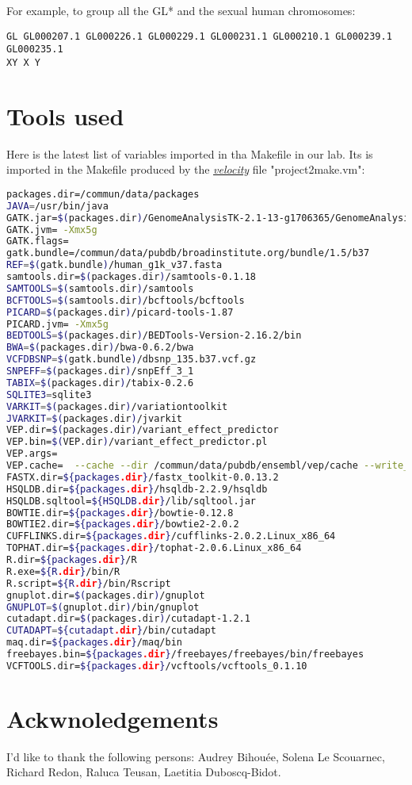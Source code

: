 \documentclass{article}
\newcommand{\velocity}{\href{http://velocity.apache.org/}{\em{velocity}}}
\begin{document}
For example, to group all the GL* and the sexual human chromosomes:
\begin{lstlisting}
GL GL000207.1 GL000226.1 GL000229.1 GL000231.1 GL000210.1 GL000239.1 GL000235.1 
XY X Y
\end{lstlisting} 

\section{Tools used}
Here is the latest list of variables imported in tha Makefile in our lab. Its is imported in the Makefile produced by the \velocity{} file "project2make.vm":
\begin{lstlisting}[language=bash]
packages.dir=/commun/data/packages
JAVA=/usr/bin/java
GATK.jar=$(packages.dir)/GenomeAnalysisTK-2.1-13-g1706365/GenomeAnalysisTK.jar
GATK.jvm= -Xmx5g
GATK.flags=
gatk.bundle=/commun/data/pubdb/broadinstitute.org/bundle/1.5/b37
REF=$(gatk.bundle)/human_g1k_v37.fasta
samtools.dir=$(packages.dir)/samtools-0.1.18
SAMTOOLS=$(samtools.dir)/samtools 
BCFTOOLS=$(samtools.dir)/bcftools/bcftools
PICARD=$(packages.dir)/picard-tools-1.87
PICARD.jvm= -Xmx5g 
BEDTOOLS=$(packages.dir)/BEDTools-Version-2.16.2/bin
BWA=$(packages.dir)/bwa-0.6.2/bwa
VCFDBSNP=$(gatk.bundle)/dbsnp_135.b37.vcf.gz
SNPEFF=$(packages.dir)/snpEff_3_1
TABIX=$(packages.dir)/tabix-0.2.6
SQLITE3=sqlite3
VARKIT=$(packages.dir)/variationtoolkit
JVARKIT=$(packages.dir)/jvarkit
VEP.dir=$(packages.dir)/variant_effect_predictor
VEP.bin=$(VEP.dir)/variant_effect_predictor.pl
VEP.args=
VEP.cache=  --cache --dir /commun/data/pubdb/ensembl/vep/cache --write_cache
FASTX.dir=${packages.dir}/fastx_toolkit-0.0.13.2
HSQLDB.dir=${packages.dir}/hsqldb-2.2.9/hsqldb
HSQLDB.sqltool=${HSQLDB.dir}/lib/sqltool.jar
BOWTIE.dir=${packages.dir}/bowtie-0.12.8
BOWTIE2.dir=${packages.dir}/bowtie2-2.0.2
CUFFLINKS.dir=${packages.dir}/cufflinks-2.0.2.Linux_x86_64
TOPHAT.dir=${packages.dir}/tophat-2.0.6.Linux_x86_64
R.dir=${packages.dir}/R
R.exe=${R.dir}/bin/R
R.script=${R.dir}/bin/Rscript
gnuplot.dir=$(packages.dir)/gnuplot            
GNUPLOT=$(gnuplot.dir)/bin/gnuplot
cutadapt.dir=$(packages.dir)/cutadapt-1.2.1
CUTADAPT=${cutadapt.dir}/bin/cutadapt
maq.dir=${packages.dir}/maq/bin
freebayes.bin=${packages.dir}/freebayes/freebayes/bin/freebayes
VCFTOOLS.dir=${packages.dir}/vcftools/vcftools_0.1.10
\end{lstlisting}


\section{Ackwnoledgements}
I'd like to thank the following persons:  Audrey Bihouée, Solena Le Scouarnec, Richard Redon, Raluca Teusan, Laetitia Duboscq-Bidot.
\end{document}
